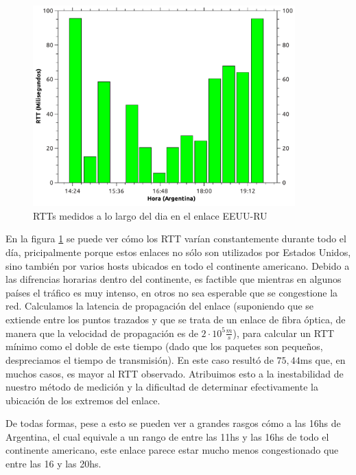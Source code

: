 \begin{figure}[H]
  \centering
    \includegraphics[width=0.9\textwidth]{graficos/rtts_dia_finlandia.pdf}
    \caption{RTTs medidos a lo largo del dia en el enlace EEUU-RU}
    \label{fig:rtts_fin}
\end{figure}


En la figura \ref{fig:rtts_fin} se puede ver cómo los RTT varían constantemente durante todo el día, pricipalmente porque estos enlaces no sólo son utilizados por Estados Unidos, sino también por varios hosts ubicados en todo el continente americano. Debido a las difrencias horarias dentro del continente, es factible que mientras en algunos países el tráfico es muy intenso, en otros no sea esperable que se congestione la red. Calculamos la latencia de propagación del enlace (suponiendo que se extiende entre los puntos trazados y que se trata de un enlace de fibra óptica, de manera que la velocidad de propagación es de $2\cdot 10^{5}\frac{m}{s}$), para calcular un RTT mínimo como el doble de este tiempo (dado que los paquetes son pequeños, despreciamos el tiempo de transmisión). En este caso resultó de $75,44$ms que, en muchos casos, es mayor al RTT observado. Atribuimos esto a la inestabilidad de nuestro método de medición y la dificultad de determinar efectivamente la ubicación de los extremos del enlace.

De todas formas, pese a esto se pueden ver a grandes rasgos cómo a las 16hs de Argentina, el cual equivale a un rango de entre las 11hs y las 16hs de todo el continente americano, este enlace parece estar mucho menos congestionado que entre las 16 y las 20hs. 

